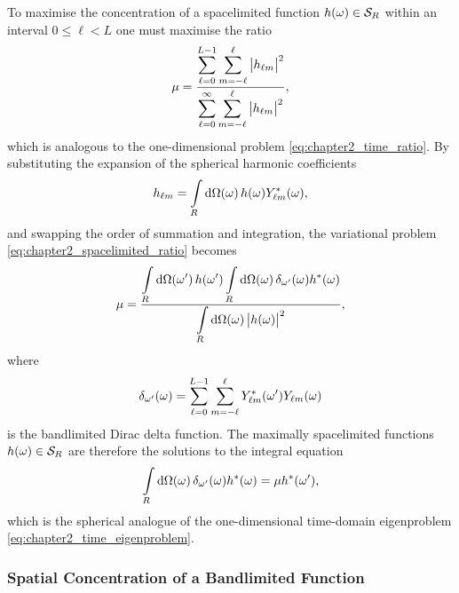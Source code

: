 To maximise the concentration of a spacelimited function \(\pixel{h} \in \spaceSpacelimit{}\) within an interval \(0 \leq \ell < L\) one must maximise the ratio
%
\begin{equation}\label{eq:chapter2_spacelimited_ratio}
	\mu
	= \frac{\displaystyle\sum\limits_{\ell=0}^{L-1} \sum\limits_{m=-\ell}^{\ell} \abs{\harmonic{h}}^{2}}
	{\displaystyle\sum\limits_{\ell=0}^{\infty} \sum\limits_{m=-\ell}^{\ell} \abs{\harmonic{h}}^{2}},
\end{equation}
%
which is analogous to the one-dimensional problem \cref{eq:chapter2_time_ratio}.
By substituting the expansion of the spherical harmonic coefficients
%
\begin{equation}
	\harmonic{h}
	= \integrateRegion{\sphereVolume} \pixel{h} \pixel{\conj{\harmonic{Y}}},
\end{equation}
%
and swapping the order of summation and integration, the variational problem \cref{eq:chapter2_spacelimited_ratio} becomes
%
\begin{equation}
	\mu
	= \frac{\integrateRegion{\sphereVolume[']} \pixel[']{h} \integrateRegion{\sphereVolume} \pixel{\delta_{\omega'}} \pixel{\conj{h}}}
	{\integrateRegion{\sphereVolume} \abs{\pixel{h}}^{2}},
\end{equation}
%
where
%
\begin{equation}
	\pixel{\delta_{\omega'}}
	= \sum\limits_{\ell=0}^{L-1} \sum\limits_{m=-\ell}^{\ell} \pixel[']{\conj{\harmonic{Y}}} \pixel{\harmonic{Y}}
\end{equation}
%
is the bandlimited Dirac delta function.
The maximally spacelimited functions \(\pixel{h} \in \spaceSpacelimit{}\) are therefore the solutions to the integral equation
%
\begin{equation}
	\integrateRegion{\sphereVolume} \pixel{\delta_{\omega'}} \pixel{\conj{h}}
	= \mu \pixel[']{\conj{h}},
\end{equation}
%
which is the spherical analogue of the one-dimensional time-domain eigenproblem \cref{eq:chapter2_time_eigenproblem}.

\subsubsection{Spatial Concentration of a Bandlimited Function}\label{sec:chapter2_spatial_concentration_bandlimited_function}


